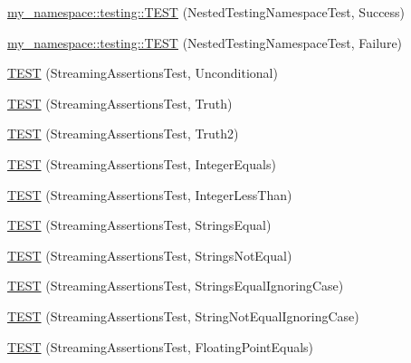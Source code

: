\begin{DoxyCompactItemize}
\item 
\mbox{\hyperlink{namespacemy__namespace_1_1testing_ad673a1b79baca8e8c493774b2a4b0127}{my\+\_\+namespace\+::testing\+::\+T\+E\+ST}} (Nested\+Testing\+Namespace\+Test, Success)
\item 
\mbox{\hyperlink{namespacemy__namespace_1_1testing_aa568f6a68b9e42841f6da570ef62b623}{my\+\_\+namespace\+::testing\+::\+T\+E\+ST}} (Nested\+Testing\+Namespace\+Test, Failure)
\item 
\mbox{\hyperlink{_obj__test_2lib_2googletest-master_2googletest_2test_2gtest__unittest_8cc_a1118ea85887fba8f2dd371d1add98cd5}{T\+E\+ST}} (Streaming\+Assertions\+Test, Unconditional)
\item 
\mbox{\hyperlink{_obj__test_2lib_2googletest-master_2googletest_2test_2gtest__unittest_8cc_a5081f1d21cba3545511f97cc2be73da8}{T\+E\+ST}} (Streaming\+Assertions\+Test, Truth)
\item 
\mbox{\hyperlink{_obj__test_2lib_2googletest-master_2googletest_2test_2gtest__unittest_8cc_aa957aa71ef10bd134fe2d6f702e264df}{T\+E\+ST}} (Streaming\+Assertions\+Test, Truth2)
\item 
\mbox{\hyperlink{_obj__test_2lib_2googletest-master_2googletest_2test_2gtest__unittest_8cc_af9ba09b04506bd0e6b81221396535889}{T\+E\+ST}} (Streaming\+Assertions\+Test, Integer\+Equals)
\item 
\mbox{\hyperlink{_obj__test_2lib_2googletest-master_2googletest_2test_2gtest__unittest_8cc_a8cfc5b3fcdf4593236319966b11dcc52}{T\+E\+ST}} (Streaming\+Assertions\+Test, Integer\+Less\+Than)
\item 
\mbox{\hyperlink{_obj__test_2lib_2googletest-master_2googletest_2test_2gtest__unittest_8cc_a474efe55930f8fc5fa7baa2360d5cda0}{T\+E\+ST}} (Streaming\+Assertions\+Test, Strings\+Equal)
\item 
\mbox{\hyperlink{_obj__test_2lib_2googletest-master_2googletest_2test_2gtest__unittest_8cc_a7393a1560b4cf4ab39cf3eb20ca10345}{T\+E\+ST}} (Streaming\+Assertions\+Test, Strings\+Not\+Equal)
\item 
\mbox{\hyperlink{_obj__test_2lib_2googletest-master_2googletest_2test_2gtest__unittest_8cc_a82bafab19e101ad95823eb58e6676df0}{T\+E\+ST}} (Streaming\+Assertions\+Test, Strings\+Equal\+Ignoring\+Case)
\item 
\mbox{\hyperlink{_obj__test_2lib_2googletest-master_2googletest_2test_2gtest__unittest_8cc_a83a5ce843f2acfe262c164ed6ce989b7}{T\+E\+ST}} (Streaming\+Assertions\+Test, String\+Not\+Equal\+Ignoring\+Case)
\item 
\mbox{\hyperlink{_obj__test_2lib_2googletest-master_2googletest_2test_2gtest__unittest_8cc_a575e502c03840cac57d6dc6697e39240}{T\+E\+ST}} (Streaming\+Assertions\+Test, Floating\+Point\+Equals)

\end{DoxyCompactItemize}
